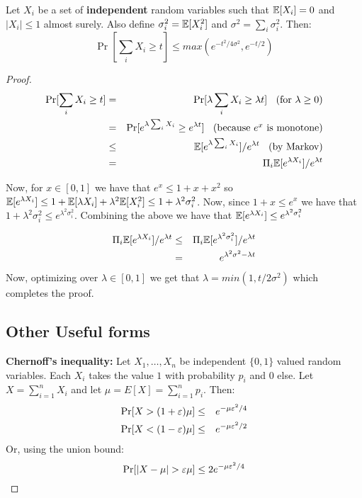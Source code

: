 \documentclass{article}
\begin{document}
\begin{theorem}
Let $X_i$ be a set of {\bf independent} random variables such that ${\mathbb E}[X_i] = 0$ and $|X_i| \le 1$ almost surely.
Also define $\sigma_i^2 = {\mathbb E}[X_i^2]$ and $\sigma^2 = \sum_i \sigma_i^2$. Then:
\[
\Pr[ \sum_i X_i \ge t ] \le max(e^{-t^2/4\sigma^2} , e^{-t/2})
\]

\end{theorem}
\begin{proof}
\begin{eqnarray}
\Pr[ \sum_i X_i \ge t ] &=& \Pr[ \lambda \sum_i X_i \ge \lambda  t ]  \mbox{\;\; (for $\lambda \ge 0$)} \\
&= &\Pr[ e^{\lambda \sum_i X_i} \ge e^{\lambda  t} ]   \mbox{\;\; (because $e^x$ is monotone)} \\
&\le &{\mathbb E}[e^{\lambda \sum_i X_i}] /e^{\lambda  t} \mbox{\;\; (by Markov)} \\
&=& \Pi_i {\mathbb E}[e^{\lambda X_i}] /e^{\lambda  t} 
\end{eqnarray}

Now, for $x \in [0,1]$ we have that $e^x \le 1 + x + x^2$ so ${\mathbb E}[e^{\lambda X_i}] \le 1 + {\mathbb E}[\lambda X_i] + \lambda^2 {\mathbb E}[X_i^2] \le 1 + \lambda^2 \sigma^2_i$.
Now, since $1+x \le e^x$ we have that $1 + \lambda^2 \sigma^2_i \le e^{\lambda^2 \sigma_i^2}$. Combining the above we have that ${\mathbb E}[e^{\lambda X_i}] \le e^{\lambda^2 \sigma_i^2}$

\begin{eqnarray}
\Pi_i {\mathbb E}[e^{\lambda X_i}] /e^{\lambda  t} &\le& \Pi_i {\mathbb E}[e^{\lambda^2 \sigma_i^2}] /e^{\lambda  t}\\
&= & e^{\lambda^2 \sigma^2 - \lambda t}
\end{eqnarray}
Now, optimizing over $\lambda \in [0,1]$ we get that $\lambda = min(1,t/2\sigma^2)$ which completes the proof.


\subsection{Other Useful forms}
 {\bf Chernoff's inequality:} Let $X_1,\ldots,X_n$ be independent
$\{0,1\}$ valued random variables. Each $X_i$ takes the value $1$
with probability $p_i$ and $0$ else. Let $X = \sum_{i=1}^{n}X_i$ and
let $\mu = E[X] = \sum_{i=1}^{n}p_i$. Then:
\begin{eqnarray*}
\Pr[X > (1+\varepsilon)\mu] &\le& e^{-\mu \varepsilon^2/4}\\
\Pr[X < (1-\varepsilon)\mu] &\le& e^{-\mu \varepsilon^2/2}
\end{eqnarray*}
Or, using the union bound:
\[
\Pr[|X - \mu| > \varepsilon\mu] \le 2e^{-\mu \varepsilon^2/4}
\]


\end{proof}
\end{document}
